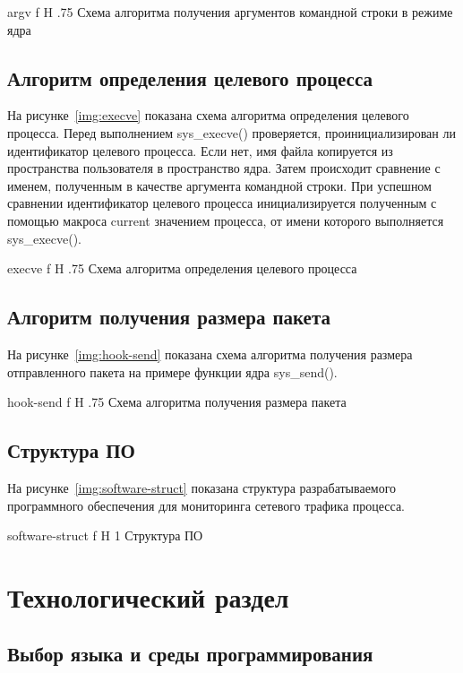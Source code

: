\documentclass{bmstu}
\begin{document}
    {argv}
    {f}
    {H}
    {.75\textwidth}
    {Схема алгоритма получения аргументов командной строки в режиме ядра}

\pagebreak
\section{Алгоритм определения целевого процесса}

На рисунке~\ref{img:execve} показана схема алгоритма определения целевого процесса. 
Перед выполнением sys\_execve() проверяется, проинициализирован ли идентификатор целевого процесса. 
Если нет, имя файла копируется из пространства пользователя в пространство ядра. 
Затем происходит сравнение с именем, полученным в качестве аргумента командной строки. 
При успешном сравнении идентификатор целевого процесса инициализируется полученным с помощью макроса current значением процесса, от имени которого выполняется sys\_execve().

    {execve}
    {f}
    {H}
    {.75\textwidth}
    {Схема алгоритма определения целевого процесса}

\pagebreak
\section{Алгоритм получения размера пакета}

На рисунке~\ref{img:hook-send} показана схема алгоритма получения размера отправленного пакета на примере функции ядра sys\_send().

    {hook-send}
    {f}
    {H}
    {.75\textwidth}
    {Схема алгоритма получения размера пакета}

\pagebreak
\section{Структура ПО}

На рисунке~\ref{img:software-struct} показана структура разрабатываемого программного обеспечения для мониторинга сетевого трафика процесса.

    {software-struct}
    {f}
    {H}
    {1\textwidth}
    {Структура ПО} 

\chapter{Технологический раздел}

\section{Выбор языка и среды программирования}
\end{document}
